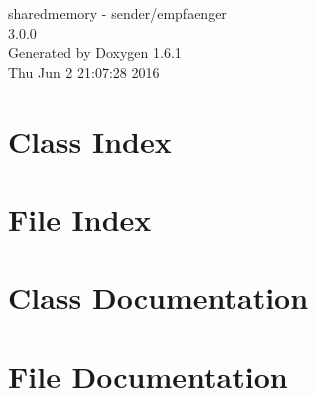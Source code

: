 \documentclass[a4paper]{book}
\begin{document}
\hypersetup{pageanchor=false}
\begin{titlepage}
\vspace*{7cm}
\begin{center}
{\Large sharedmemory -\/ sender/empfaenger \\[1ex]\large 3.0.0 }\\
\vspace*{1cm}
{\large Generated by Doxygen 1.6.1}\\
\vspace*{0.5cm}
{\small Thu Jun 2 21:07:28 2016}\\
\end{center}
\end{titlepage}
\clearemptydoublepage
{}
\tableofcontents
\clearemptydoublepage
{}
\hypersetup{pageanchor=true}
\chapter{Class Index}

\chapter{File Index}

\chapter{Class Documentation}

\chapter{File Documentation}




\printindex
\end{document}
